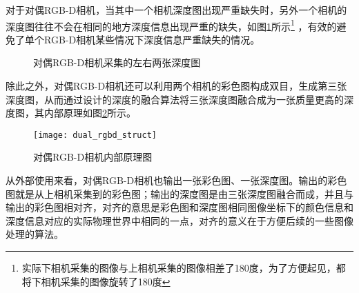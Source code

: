 对于对偶RGB-D相机，当其中一个相机深度图出现严重缺失时，另外一个相机的深度图往往不会在相同的地方深度信息出现严重的缺失，如图\ref{fig:dual_rgbd_depth}所示\footnote{实际下相机采集的图像与上相机采集的图像相差了180度，为了方便起见，都将下相机采集的图像旋转了180度}
，有效的避免了单个RGB-D相机某些情况下深度信息严重缺失的情况。
\begin{figure}[!ht]
  \centering
  \hfill
  \caption{对偶RGB-D相机采集的左右两张深度图}
  \label{fig:dual_rgbd_depth}
\end{figure}

除此之外，对偶RGB-D相机还可以利用两个相机的彩色图构成双目，生成第三张深度图，从而通过设计的深度的融合算法将三张深度图融合成为一张质量更高的深度图，其内部原理如图\ref{fig:dual_rgbd_struct}所示。
\begin{figure}[!ht]
  \centering
  \texttt{[image: dual\_rgbd\_struct]}
  \caption{对偶RGB-D相机内部原理图}
  \label{fig:dual_rgbd_struct}
\end{figure}

从外部使用来看，对偶RGB-D相机也输出一张彩色图、一张深度图。输出的彩色图就是从上相机采集到的彩色图；输出的深度图是由三张深度图融合而成，并且与输出的彩色图相对齐，对齐的意思是彩色图和深度图相同图像坐标下的颜色信息和深度信息对应的实际物理世界中相同的一点，对齐的意义在于方便后续的一些图像处理的算法。

